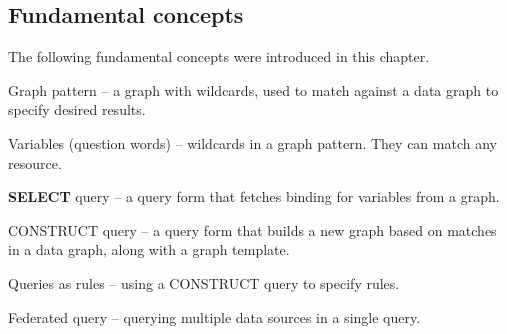 \subsection{Fundamental concepts}

The following fundamental concepts were introduced in this chapter.

Graph pattern -- a graph with wildcards, used to match against a data
graph to specify desired results.

Variables (question words) -- wildcards in a graph pattern. They can
match any resource.

\textbf{SELECT} query -- a query form that fetches binding for variables from a
graph.

CONSTRUCT query -- a query form that builds a new graph based on matches
in a data graph, along with a graph template.

Queries as rules -- using a CONSTRUCT query to specify rules.

Federated query -- querying multiple data sources in a single query.

